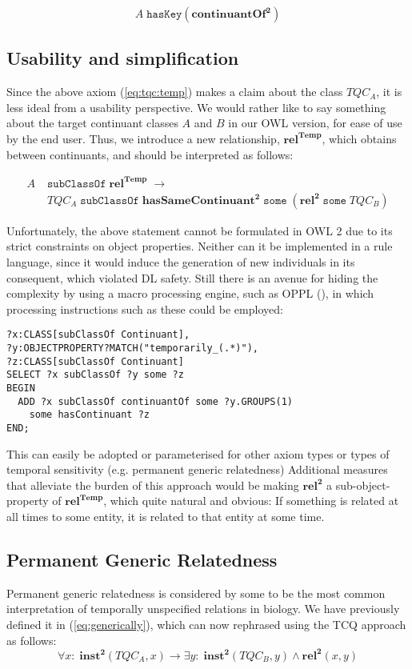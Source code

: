 \documentclass{ao2e}
\newcommand{\mirel}[1]{\ensuremath{\mathrm{\mathbf{#1}}}}
\newcommand{\mclass}[1]{\ensuremath{\mathit{#1}}}
\newcommand{\mrel}[2]{\mirel{#1^#2}}
\newcommand{\mrelb}[1]{\mrel{#1}{2}}
\newcommand{\TQC}[1]{\ensuremath{TQC_{\mclass{#1}}}}
\newcommand{\mreltemp}[1]{\mrel{#1}{{Temp}}}
\begin{document}
\begin{equation}
\mclass{A}\;\mathtt{hasKey}(\mrelb{continuantOf})
\end{equation}

\subsection{Usability and simplification}
Since the above axiom (\ref{eq:tqc:temp}) makes a claim about the class \TQC{A},
it is less ideal from a usability perspective. We would rather like to say
something about the target continuant classes \mclass{A} and \mclass{B} in our OWL version, for
ease of use by the end user. Thus, we introduce a new relationship,
\mreltemp{rel}, which obtains between continuants, and should be interpreted as follows:


\begin{equation}
\begin{split}
\mclass{A}\;&\mathtt{subClassOf}\;\mreltemp{rel}\;\rightarrow\\
&\TQC{A}\;\mathtt{subClassOf}\;\mrelb{hasSameContinuant}\;\mathtt{some}\;(\mrelb{rel}\;\mathtt{some}\;
\TQC{B}) 
\end{split}
\end{equation}

Unfortunately, the above statement cannot be formulated in OWL 2 due to its
strict constraints on object properties. Neither can it be implemented in a
rule language, since it would induce the generation of new individuals in its
consequent, which violated DL safety. Still there is an avenue for hiding the
complexity by using a macro processing engine, such as OPPL (\cite{OPPL}), in
which processing instructions such as these could be employed:

\begin{lstlisting}
?x:CLASS[subClassOf Continuant],
?y:OBJECTPROPERTY?MATCH("temporarily_(.*)"),
?z:CLASS[subClassOf Continuant]
SELECT ?x subClassOf ?y some ?z
BEGIN
  ADD ?x subClassOf continuantOf some ?y.GROUPS(1) 
    some hasContinuant ?z
END;
\end{lstlisting}
This can easily be adopted or parameterised for other axiom types or types of temporal
sensitivity (e.g. permanent generic relatedness) Additional measures that alleviate the burden of this approach would be making
\mrelb{rel} a sub-object-property of \mreltemp{rel}, which quite natural and
obvious: If something is related at all times to some entity, it is related to
that entity at some time.
\subsection{Permanent Generic Relatedness}
Permanent generic relatedness is considered by some to be the most common
interpretation of temporally unspecified relations in biology. We have
previously defined it in (\ref{eq:generically}), which can
now rephrased using the TCQ approach as follows:
\begin{equation}
\forall x:\; \mrelb{inst}(\TQC{A},x) \rightarrow \exists y :\;
\mrelb{inst}(\TQC{B}, y) \wedge \mrelb{rel}(x,y)
\label{eq:tqc:pg}
\end{equation}
\end{document}
